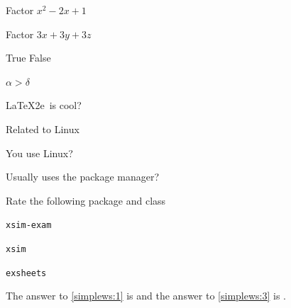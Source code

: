 \documentclass{article}
\begin{document}
\begin{enumext}[mode-box,save-ans=simplews,labelsep=10pt,columns=2,check-ans=true,show-ans=true,nosep,save-ref=true,wrap-label={\tikz[scale=0.25]\duck[signpost=\scalebox{0.6}{#1}];}]
  \item Factor $x^{2}-2x+1$ 
  \item Factor $3x+3y+3z$ 
  \item True False
    \begin{enumext}[nosep]
      \item $\alpha > \delta$ 
      \item \LaTeX2e\ is cool? 
    \end{enumext}
  \item Related to Linux
    \begin{enumext}[nosep]
      \item You use Linux? 
      \item Usually uses the package manager? 
      \item Rate the following package and class
        \begin{enumext}[nosep]
          \item \texttt{xsim-exam} 
          \item \texttt{xsim} 
          \item \texttt{exsheets} 
        \end{enumext}
    \end{enumext}
\end{enumext}

The answer to \ref{simplews:1} is  and the answer
to \ref{simplews:3} is .

\end{document}
